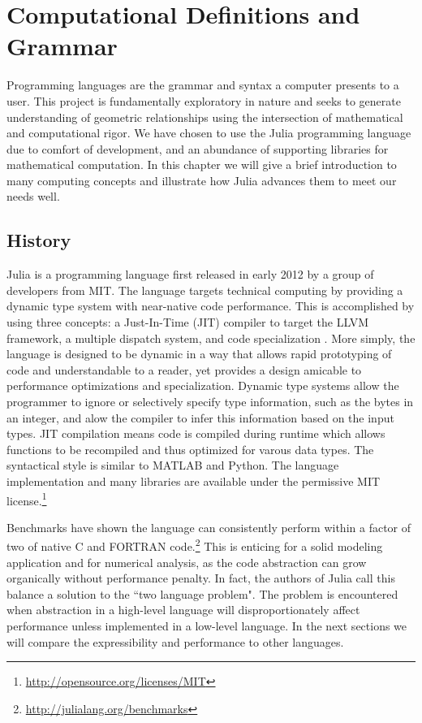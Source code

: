 \chapter{Computational Definitions and Grammar}

Programming languages are the grammar and syntax a computer presents to a user.
This project is fundamentally exploratory in nature and seeks to generate
understanding of geometric relationships using the intersection of
mathematical and computational rigor. We have chosen to use the Julia
programming language due to comfort of development, and an abundance of
supporting libraries for mathematical computation. In this chapter
we will give a brief introduction to many computing concepts and illustrate
how Julia advances them to meet our needs well.

\section{History}
Julia is a programming language first released in early 2012 by a group of
developers from MIT. The language targets technical computing by providing a
dynamic type system with near-native code performance. This is accomplished by
using three concepts: a Just-In-Time (JIT) compiler to target the LLVM framework,
a multiple dispatch system, and code specialization\cite{bezanson2012julia}
\cite{Bezanson_Edelman_Karpinski_Shah_2014}.
More simply, the language is designed to be dynamic in a way that allows
rapid prototyping of code and understandable to a reader, yet provides
a design amicable to performance optimizations and specialization.
Dynamic type systems allow the programmer to ignore or selectively
specify type information, such
as the bytes in an integer, and alow the compiler to infer this information
based on the input types. JIT compilation means code is compiled during runtime
which allows functions to be recompiled and thus optimized for varous
data types.
The syntactical style is similar to MATLAB and Python.
The language implementation and many libraries are available under the
permissive MIT license.\footnote{\url{http://opensource.org/licenses/MIT}}

Benchmarks have shown the language can consistently perform within a factor of
two of native C and FORTRAN code.\footnote{\url{http://julialang.org/benchmarks}}
This is enticing for a solid modeling application and for numerical analysis,
as the code abstraction can grow organically without performance penalty.
In fact, the authors of Julia call this balance a solution to the 
``two language problem". The problem is encountered when abstraction in a
high-level language will disproportionately affect performance unless
implemented in a low-level language. In the next sections we will compare
the expressibility and performance to other languages.

